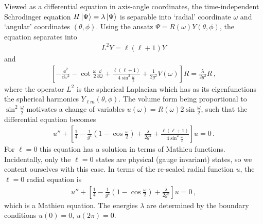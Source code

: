 \documentclass[reprint,superscriptaddress,pra,nofootinbib,preprintnumbers,floatfix]{revtex4-1}
\begin{document}
Viewed as a differential equation in axis-angle coordinates, the time-independent Schrodinger equation $H\ket{\Psi} = \lambda \ket{\Psi}$ is separable into `radial' coordinate $\omega$ and `angular' coordinates $(\theta,\phi)$. 
%
Using the ansatz $\Psi = R(\omega)Y(\theta,\phi)$, the equation separates into
%
\begin{align}
    L^2Y = \ell(\ell+1)Y
\end{align}
%
and
%
\begin{align}
    \left[ -\frac{\dd ^2}{\dd \omega^2} - \cot\frac{\omega}{2}\frac{\dd }{\dd \omega} + \frac{\ell(\ell+1)}{4\sin^2\frac{\omega}{2}} + \frac{1}{2g^2}V(\omega)  \right]R = \frac{\lambda }{2g^2}R
    \,,
\end{align}
%
where the operator $L^2$ is the spherical Laplacian which has as its eigenfunctions the spherical harmonics $Y_{\ell m}(\theta,\phi)$.
%
The volume form being proportional to $\sin^2\frac{\omega}{2}$ motivates a change of variables $u(\omega)=R(\omega) 2 \sin\frac{\omega}{2}$, such that the differential equation becomes
%
\begin{align}
    u'' + \left[\frac{1}{4} - \frac{1}{g^4}\left(1-\cos\frac{\omega}{2}\right) + \frac{\lambda}{2g^2} + \frac{\ell(\ell+1)}{4 \sin^2 \frac{\omega}{2}} \right]u = 0
    \,.
\end{align}
%
For $\ell=0$ this equation has a solution in terms of Mathieu functions. 
%
Incidentally, only the $\ell=0$ states are physical (gauge invariant) states, so we content ourselves with this case. 
%
In terms of the re-scaled radial function $u$, the $\ell=0$ radial equation is
%
\begin{align}
    u'' + \left[\frac{1}{4} - \frac{1}{g^4}\left(1-\cos\frac{\omega}{2}\right) + \frac{\lambda}{2g^2}\right]u = 0
    \,,
\end{align}
%
which is a Mathieu equation. 
%
The energies $\lambda$ are determined by the boundary conditions $u(0)=0$, $u(2\pi)=0$.
\end{document}
